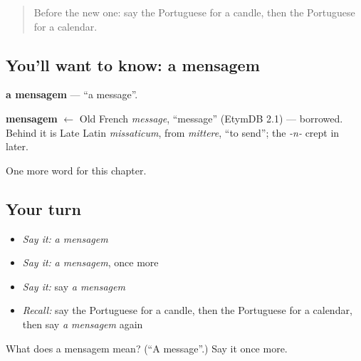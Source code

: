\label{lesson:PT-C101-mensagem}



\begin{quote}
Before the new one: say the Portuguese for a candle, then the Portuguese for a calendar.
\end{quote}

\subsection*{You'll want to know: a mensagem}
\textbf{a mensagem} — \textquotedblleft{}a message\textquotedblright{}.

\begin{cousinweb}
\textbf{mensagem} $\leftarrow$ Old French \emph{message}, \textquotedblleft{}message\textquotedblright{} (EtymDB 2.1) — borrowed. Behind it is Late Latin \emph{missaticum}, from \emph{mittere}, \textquotedblleft{}to send\textquotedblright{}; the \emph{-n-} crept in later.
\end{cousinweb}

\begin{grammarlens}[title={What you've built}]
One more word for this chapter.
\end{grammarlens}

\subsection*{Your turn}
\begin{itemize}
\raggedright
  \item \emph{Say it:} \emph{a mensagem}
  \item \emph{Say it:} \emph{a mensagem}, once more
  \item \emph{Say it:} say \emph{a mensagem}
  \item \emph{Recall:} say the Portuguese for a candle, then the Portuguese for a calendar, then say \emph{a mensagem} again
\end{itemize}

\begin{tcolorbox}[breakable,colback=teal!4,colframe=teal!35!black,title={Before you move on}]
What does a mensagem mean? (\textquotedblleft{}A message\textquotedblright{}.) Say it once more.
\end{tcolorbox}
